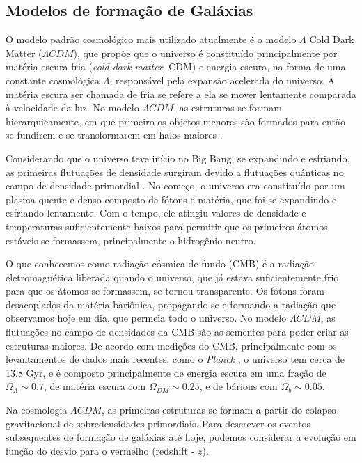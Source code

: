 \subsection{Modelos de formação de Galáxias}\label{subsec:modelo_formacao_galaxias}

O modelo padrão cosmológico mais utilizado atualmente é o modelo $\Lambda$ Cold Dark Matter ($\Lambda CDM$), que propõe que o universo é constituído principalmente por matéria escura fria ({\it cold dark matter}, CDM) e energia escura, na forma de uma constante cosmológica $\Lambda$, responsável pela expansão acelerada do universo. A matéria escura ser chamada de fria se refere a ela se mover lentamente comparada à velocidade da luz. No modelo $\Lambda CDM$, as estruturas se formam hierarquicamente, em que primeiro os objetos menores são formados para então se fundirem e se transformarem em halos maiores \citep{Blumenthal_1984}.

Considerando que o universo teve início no Big Bang, se expandindo e esfriando, as primeiras flutuações de densidade surgiram devido a flutuações quânticas no campo de densidade primordial \citep{liddle_1999}. No começo, o universo era constituído por um plasma quente e denso composto de fótons e matéria, que foi se expandindo e esfriando lentamente. Com o tempo, ele atingiu valores de densidade e temperaturas suficientemente baixos para permitir que os primeiros átomos estáveis se formassem, principalmente o hidrogênio neutro.

O que conhecemos como radiação cósmica de fundo (CMB) é a radiação eletromagnética liberada quando o universo, que já estava suficientemente frio para que os átomos se formassem, se tornou transparente. Os fótons foram desacoplados da matéria bariônica, propagando-se e formando a radiação que observamos hoje em dia, que permeia todo o universo. No modelo $\Lambda CDM$, as flutuações no campo de densidades da CMB são as sementes para poder criar as estruturas maiores. De acordo com medições do CMB, principalmente com os levantamentos de dados mais recentes, como o \textit{Planck} \citep{Planck_2020}, o universo tem cerca de 13.8 Gyr, e é composto principalmente de energia escura em uma fração de $\Omega_\Lambda \sim 0.7$, de matéria escura com $\Omega_{DM} \sim 0.25$, e de bárions com $\Omega_b \sim 0.05$.

Na cosmologia $\Lambda CDM$, as primeiras estruturas se formam a partir do colapso gravitacional de sobredensidades primordiais. Para descrever os eventos subsequentes de formação de galáxias até hoje, podemos considerar a evolução em função do desvio para o vermelho (redshift - $z$).

